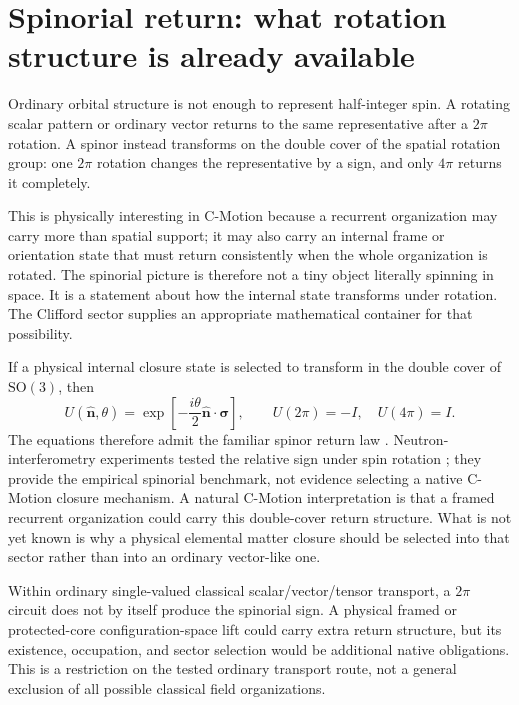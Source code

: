 \documentclass[11pt]{article}
\theoremstyle{definition}
\newcommand{\SO}{\mathrm{SO}(3)}
\begin{document}
\section{Spinorial return: what rotation structure is already available}
\label{sec:spin}

Ordinary orbital structure is not enough to represent half-integer spin.  A rotating scalar
pattern or ordinary vector returns to the same representative after a $2\pi$ rotation.  A
spinor instead transforms on the double cover of the spatial rotation group: one $2\pi$
rotation changes the representative by a sign, and only $4\pi$ returns it completely.

This is physically interesting in C-Motion because a recurrent organization may carry more
than spatial support; it may also carry an internal frame or orientation state that must return
consistently when the whole organization is rotated.  The spinorial picture is therefore not a
tiny object literally spinning in space.  It is a statement about how the internal state
transforms under rotation.  The Clifford sector supplies an appropriate mathematical container
for that possibility.

If a physical internal closure state is selected to transform in the double cover of
$\SO$, then
\begin{equation}
 U(\hat{\mathbf n},\theta)
 =\exp\!\left[-\frac{i\theta}{2}\hat{\mathbf n}\cdot\bm\sigma\right],
 \qquad U(2\pi)=-I,\quad U(4\pi)=I.
 \label{eq:4pi}
\end{equation}
The equations therefore admit the familiar spinor return law
\cite{RauchWerner2000}. Neutron-interferometry experiments tested the
relative sign under spin rotation \cite{Rauch1975Spinor,Werner1975}; they
provide the empirical spinorial benchmark, not evidence selecting a native
C-Motion closure mechanism. A natural C-Motion interpretation is that a framed recurrent
organization could carry this double-cover return structure.  What is not yet known is why a
physical elemental matter closure should be selected into that sector rather than into an
ordinary vector-like one.

Within ordinary single-valued classical scalar/vector/tensor transport, a
$2\pi$ circuit does not by itself produce the spinorial sign.  A physical
framed or protected-core configuration-space lift could carry extra return
structure, but its existence, occupation, and sector selection would be
additional native obligations.  This is a restriction on the tested ordinary
transport route, not a general exclusion of all possible classical field
organizations.
\end{document}
